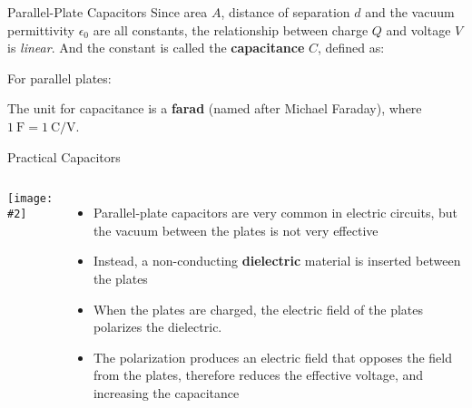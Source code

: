 \documentclass[12pt,aspectratio=169]{beamer}
\newcommand{\pic}[2]{\texttt{[image: \#2]}}
\newcommand{\eq}[2]{\vspace{#1}{\Large\begin{displaymath}#2\end{displaymath}}}
\begin{document}
\begin{frame}{Parallel-Plate Capacitors}
  Since area $A$, distance of separation $d$ and the vacuum permittivity
  $\epsilon_0$ are all constants, the relationship between charge $Q$ and
  voltage $V$ is \emph{linear}. And the constant is called the
  \textbf{capacitance} $C$, defined as:

  \eq{-.15in}{
    \boxed{C=\frac{Q}{V}}
  }

  For parallel plates:

  \eq{-.2in}{
    C=\frac{A\epsilon_0}{d}
  }

  The unit for capacitance is a \textbf{farad} (named after Michael Faraday),
  where $\SI{1}{\farad}=\SI{1}{\coulomb\per\volt}$.
\end{frame}


%  
%  



\begin{frame}{Practical Capacitors}
  \begin{columns}
    \pic{1.15}{Figure_20_05_05a}
    \begin{itemize}
    \item Parallel-plate capacitors are very common in electric circuits,
      but the vacuum between the plates is not very effective
    \item Instead, a non-conducting \textbf{dielectric} material is inserted
      between the plates
    \item When the plates are charged, the electric field of the plates
      polarizes the dielectric.
    \item The polarization  produces an electric field that opposes the field
      from the plates, therefore reduces the effective voltage, and increasing
      the capacitance
    \end{itemize}
  \end{columns}
\end{frame}
\end{document}
